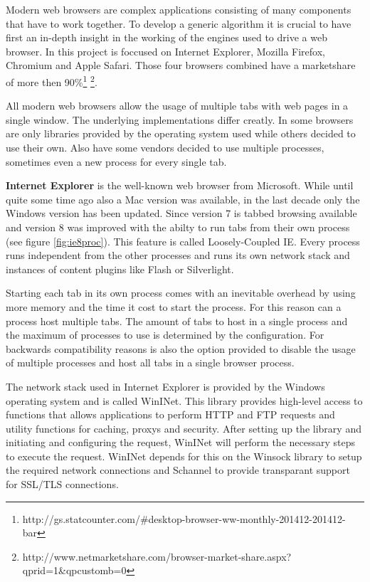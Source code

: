 

Modern web browsers are complex applications consisting of many components that have to work together. To develop a generic algorithm it is crucial to have first an in-depth insight in the working of the engines used to drive a web browser. In this project is foccused on Internet Explorer, Mozilla Firefox, Chromium and Apple Safari. Those four browsers combined have a marketshare of more then 90\%\footnote{http://gs.statcounter.com/\#desktop-browser-ww-monthly-201412-201412-bar} \footnote{http://www.netmarketshare.com/browser-market-share.aspx?qprid=1\&qpcustomb=0}.

All modern web browsers allow the usage of multiple tabs with web pages in a single window. The underlying implementations differ creatly. In some browsers are only libraries provided by the operating system used while others decided to use their own. Also have some vendors decided to use multiple processes, sometimes even a new process for every single tab.

\textbf{Internet Explorer} is the well-known web browser from Microsoft. While until quite some time ago also a Mac version was available, in the last decade only the Windows version has been updated. Since version 7 is tabbed browsing available and version 8 was improved with the abilty to run tabs from their own process (see figure \ref{fig:ie8proc}). This feature is called Loosely-Coupled IE\cite{http://blogs.msdn.com/b/ie/archive/2008/03/11/ie8-and-loosely-coupled-ie-lcie.aspx}. Every process runs independent from the other processes and runs its own network stack and instances of content plugins like Flash or Silverlight.

Starting each tab in its own process comes with an inevitable overhead by using more memory and the time it cost to start the process. For this reason can a process host multiple tabs. The amount of tabs to host in a single process and the maximum of processes to use is determined by the configuration. For backwards compatibility reasons is also the option provided to disable the usage of multiple processes and host all tabs in a single browser process.

The network stack used in Internet Explorer is provided by the Windows operating system and is called WinINet. This library provides high-level access to functions that allows applications to perform HTTP and FTP requests and utility functions for caching, proxys and security. After setting up the library and initiating and configuring the request, WinINet will perform the necessary steps to execute the request. WinINet depends for this on the Winsock library to setup the required network connections and Schannel to provide transparant support for SSL/TLS connections.

